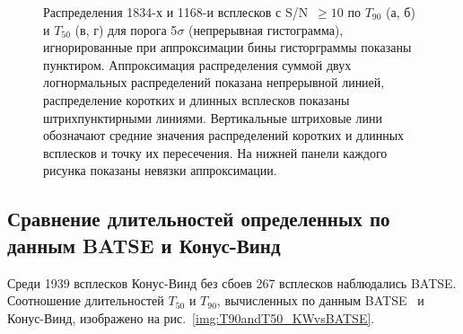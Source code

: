 \begin{figure}[h]
  \begin{minipage}[h]{0.5\textwidth}
  \end{minipage}
  \hfill
  \begin{minipage}[h]{0.5\textwidth}
  \end{minipage}
  \vfill
  \begin{minipage}[h]{0.5\textwidth}
  \end{minipage}
  \hfill
  \begin{minipage}[h]{0.5\textwidth}
  \end{minipage}
  \caption{Распределения 1834-х и 1168-и всплесков с S/N~$\geq 10$ по $T_{90}$ (а, б) и $T_{50}$ (в, г) для порога 5$\sigma$ (непрерывная гистограмма), игнорированные при аппроксимации бины гисторграммы показаны пунктиром.  Аппроксимация распределения суммой двух логнормальных распределений  показана непрерывной линией, распределение коротких и длинных всплесков показаны штрихпунктирными линиями.  Вертикальные штриховые лини обозначают средние значения распределений коротких и длинных всплесков и точку их пересечения. На нижней панели каждого рисунка показаны невязки аппроксимации.}
  \label{img:T90andT50s5}  
\end{figure}

\begin{landscape}

\end{landscape}

\subsection{Сравнение длительностей определенных по данным BATSE и Конус-Винд}
Среди 1939 всплесков Конус-Винд без сбоев 267 всплесков наблюдались BATSE. Соотношение длительностей $T_{50}$ и $T_{90}$, вычисленных по данным BATSE~\citep{Paciesas_1999} и Конус-Винд, изображено на рис.~\ref{img:T90andT50_KWvsBATSE}.

